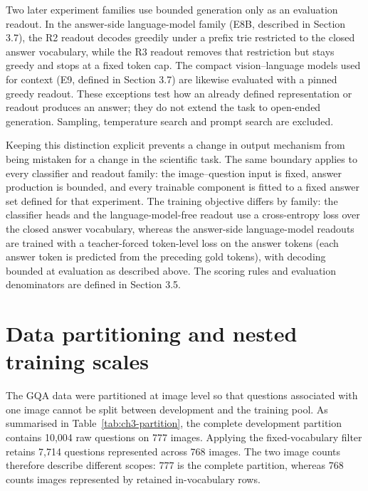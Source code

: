 Two later experiment families use bounded generation only as an evaluation readout. In the answer-side language-model family (E8B, described in Section 3.7), the R2 readout decodes greedily under a prefix trie restricted to the closed answer vocabulary, while the R3 readout removes that restriction but stays greedy and stops at a fixed token cap. The compact vision--language models used for context (E9, defined in Section 3.7) are likewise evaluated with a pinned greedy readout. These exceptions test how an already defined representation or readout produces an answer; they do not extend the task to open-ended generation. Sampling, temperature search and prompt search are excluded.

Keeping this distinction explicit prevents a change in output mechanism from being mistaken for a change in the scientific task. The same boundary applies to every classifier and readout family: the image--question input is fixed, answer production is bounded, and every trainable component is fitted to a fixed answer set defined for that experiment. The training objective differs by family: the classifier heads and the language-model-free readout use a cross-entropy loss over the closed answer vocabulary, whereas the answer-side language-model readouts are trained with a teacher-forced token-level loss on the answer tokens (each answer token is predicted from the preceding gold tokens), with decoding bounded at evaluation as described above. The scoring rules and evaluation denominators are defined in Section 3.5.

\section{Data partitioning and nested training scales}
\label{sec:ch3-data}
The GQA data \citep{hudson2019gqa} were partitioned at image level so that questions associated with one image cannot be split between development and the training pool. As summarised in Table~\ref{tab:ch3-partition}, the complete development partition contains 10,004 raw questions on 777 images. Applying the fixed-vocabulary filter retains 7,714 questions represented across 768 images. The two image counts therefore describe different scopes: 777 is the complete partition, whereas 768 counts images represented by retained in-vocabulary rows.

\begin{table}[htbp]
\centering
\caption{Data partitions and nested training scales. Image counts distinguish complete-partition images from images represented by retained rows; question counts distinguish eligible pool rows from selected training-prefix rows.}
\label{tab:ch3-partition}
\begingroup
\footnotesize
\setlength{\tabcolsep}{2.5pt}
\renewenvironment{longtable}[1]
  {\begin{tabular}{|p{0.15\textwidth}|p{0.13\textwidth}|p{0.11\textwidth}|p{0.27\textwidth}|p{0.26\textwidth}|}}
  {\end{tabular}}
\let\endhead\relax

\endgroup
\end{table}


